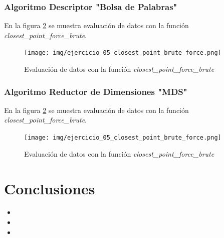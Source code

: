 \documentclass{article}
\begin{document}
\clearpage
\subsubsection{Algoritmo Descriptor "Bolsa de Palabras"}
En la figura \ref{fig:ejercicio_05_closest_point_brute_force} se muestra evaluación de datos con la función \textit{closest\_point\_force\_brute}.

\begin{figure}[h!]
	\centering
	\texttt{[image: img/ejercicio\_05\_closest\_point\_brute\_force.png]}
	\caption{Evaluación de datos con la función \textit{closest\_point\_force\_brute}}
	\label{fig:ejercicio_05_closest_point_brute_force}
\end{figure}

\clearpage
\subsubsection{Algoritmo Reductor de Dimensiones "MDS"}
En la figura \ref{fig:ejercicio_05_closest_point_brute_force} se muestra evaluación de datos con la función \textit{closest\_point\_force\_brute}.

\begin{figure}[h!]
	\centering
	\texttt{[image: img/ejercicio\_05\_closest\_point\_brute\_force.png]}
	\caption{Evaluación de datos con la función \textit{closest\_point\_force\_brute}}
	\label{fig:ejercicio_05_closest_point_brute_force}
\end{figure}

\clearpage
\section{Conclusiones}
\begin{itemize}
	\item 
	\item 
	\item 
\end{itemize}
\end{document}
